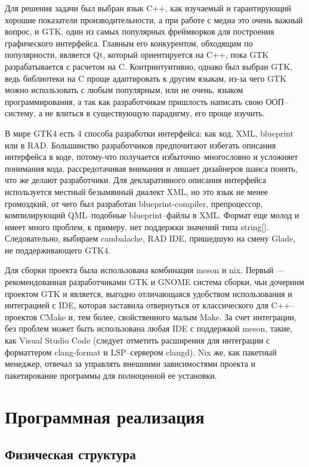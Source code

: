 \documentclass[variant=courcework]{bsuir}
\begin{document}
Для решения задачи был выбран язык C++, как изучаемый и гарантирующий хорошие
показатели производительности, а при работе с медиа это очень важный вопрос, и
GTK, один из самых популярных фреймворков для построения графического
интерфейса. Главным его конкурентом, обходящим по популярности, является Qt,
который ориентируется на C++, пока GTK разрабатывается с расчетом на C.
Контринтуитивно, однако был выбран GTK, ведь библиотеки на C проще адаптировать
к другим языкам, из-за чего GTK можно использовать с любым популярным, или не
очень, языком программирования, а так как разработчикам пришлость написать свою
ООП--систему, а не влиться в существующую парадигму, его проще изучить.

В мире GTK4 есть 4 способа разработки интерфейса: как код, XML, blueprint или в
RAD. Большинство разработчиков предпочитают избегать описания интерфейса в коде,
потому-что получается избыточно--многословно и усложняет понимания кода,
рассредотачивая внимания и лишает дизайнеров шанса понять, что же делают
разработчики. Для декларативного описания интерфейса используется местный
безымянный диалект XML, но это язык не менее громоздкий, от чего был разработан
blueprint-compiler, препроцессор, компилирующий QML--подобные blueprint--файлы в
XML. Формат еще молод и имеет много проблем, к примеру, нет поддержки значений
типа string[]. Следовательно, выбираем cambalache, RAD IDE, пришедшую на смену
Glade, не поддерживающего GTK4.

Для сборки проекта была использована комбинация meson и nix. Первый ---
рекомендованная разработчиками GTK и GNOME система сборки, чьи дочерним проектом
GTK и является, выгодно отличающаяся удобством использования и интеграцией с
IDE, которая заставила отвернуться от классического для C++--проектов CMake и,
тем более, свойственного малым Make. За счет интеграции, без проблем может быть
использована любая IDE с поддержкой meson, такие, как Visual Studio Code
(следует отметить расширения для интеграции с форматтером clang-format и
LSP--сервером clangd). Nix же, как пакетный менеджер, отвечал за управлять
внешними зависимостями проекта и пакетирование программы для полноценной ее
установки.

\chapter{Программная реализация}

\section{Физическая структура}
\end{document}
